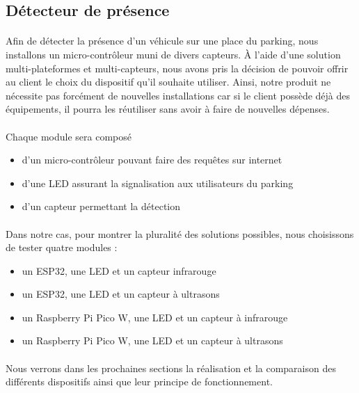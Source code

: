 \subsection{Détecteur de présence}

\paragraph*{}
Afin de détecter la présence d'un véhicule sur une place du parking, nous installons un micro-contrôleur muni de divers capteurs. À l'aide d'une solution multi-plateformes et multi-capteurs, nous avons pris la décision de pouvoir offrir au client le choix du dispositif qu'il souhaite utiliser. Ainsi, notre produit ne nécessite pas forcément de nouvelles installations car si le client possède déjà des équipements, il pourra les réutiliser sans avoir à faire de nouvelles dépenses.

\paragraph*{}
Chaque module sera composé 
\begin{itemize}
    \item d'un micro-contrôleur pouvant faire des requêtes sur internet
    \item d'une LED assurant la signalisation aux utilisateurs du parking
    \item d'un capteur permettant la détection
\end{itemize}

\paragraph*{}
Dans notre cas, pour montrer la pluralité des solutions possibles, nous choisissons de tester quatre modules :
\begin{itemize}
    \item un ESP32, une LED et un capteur infrarouge
    \item un ESP32, une LED  et un capteur à ultrasons
    \item un Raspberry Pi Pico W, une LED  et un capteur à infrarouge
    \item un Raspberry Pi Pico W, une LED  et un capteur à ultrasons
\end{itemize}

\paragraph*{}
Nous verrons dans les prochaines sections la réalisation et la comparaison des différents dispositifs ainsi que leur principe de fonctionnement.

